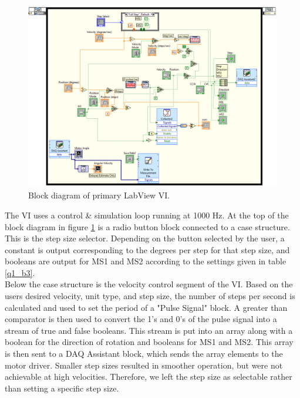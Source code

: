 \documentclass{article}
\theoremstyle{plain}
\theoremstyle{definition}
\theoremstyle{remark}
\begin{document}
\begin{figure}[hbt]
\begin{center}
\includegraphics[width = 18cm]{VIBlockDiagram.png}
\caption{Block diagram of primary LabView VI.}
\label{q2_2}
\end{center}
\end{figure}

The VI uses a control \& simulation loop running at 1000 Hz. At the top of the block diagram in figure \ref{q2_2} is a radio button block connected to a case structure. This is the step size selector. Depending on the button selected by the user, a constant is output corresponding to the degrees per step for that step size, and booleans are output for MS1 and MS2 according to the settings given in table \ref{q1_b3}.\\

Below the case structure is the velocity control segment of the VI. Based on the users desired velocity, unit type, and step size, the number of steps per second is calculated and used to set the period of a "Pulse Signal" block. A greater than comparator is then used to convert the 1's and 0's of the pulse signal into a stream of true and false booleans. This stream is put into an array along with a boolean for the direction of rotation and booleans for MS1 and MS2. This array is then sent to a DAQ Assistant block, which sends the array elements to the motor driver. Smaller step sizes resulted in smoother operation, but were not achievable at high velocities. Therefore, we left the step size as selectable rather than setting a specific step size.\\
\end{document}
